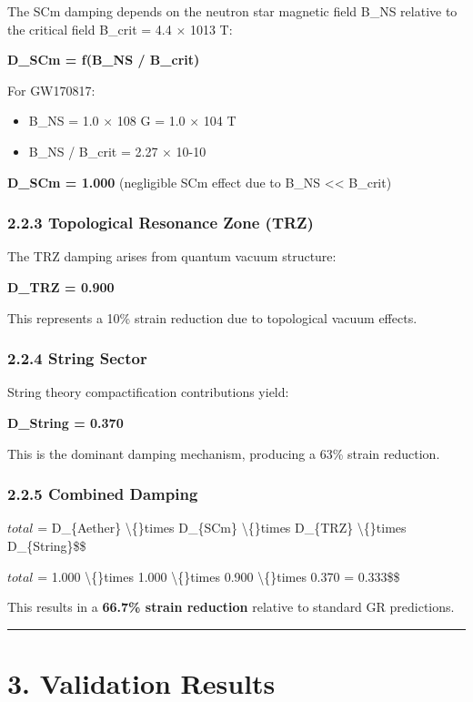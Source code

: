 \documentclass[11pt]{article}
\begin{document}
The SCm damping depends on the neutron star magnetic field B\_NS relative to the critical field B\_crit = 4.4 $\times$ 1013 T:

\textbf{D\_SCm = f(B\_NS / B\_crit)}

For GW170817:

\begin{itemize}
  \item B\_NS = 1.0 $\times$ 108 G = 1.0 $\times$ 104 T
  \item B\_NS / B\_crit = 2.27 $\times$ 10-10
\end{itemize}

\textbf{D\_SCm = 1.000} (negligible SCm effect due to B\_NS << B\_crit)

\subsubsection*{2.2.3 Topological Resonance Zone (TRZ)}

The TRZ damping arises from quantum vacuum structure:

\textbf{D\_TRZ = 0.900}

This represents a 10\% strain reduction due to topological vacuum effects.

\subsubsection*{2.2.4 String Sector}

String theory compactification contributions yield:

\textbf{D\_String = 0.370}

This is the dominant damping mechanism, producing a 63\% strain reduction.

\subsubsection*{2.2.5 Combined Damping}

$total$ = D\_\{Aether\} \textbackslash\{\}times D\_\{SCm\} \textbackslash\{\}times D\_\{TRZ\} \textbackslash\{\}times D\_\{String\}\$\$

$total$ = 1.000 \textbackslash\{\}times 1.000 \textbackslash\{\}times 0.900 \textbackslash\{\}times 0.370 = 0.333\$\$

This results in a \textbf{66.7\% strain reduction} relative to standard GR predictions.

\noindent\rule{\textwidth}{0.4pt}

\section*{3. Validation Results}
\end{document}
